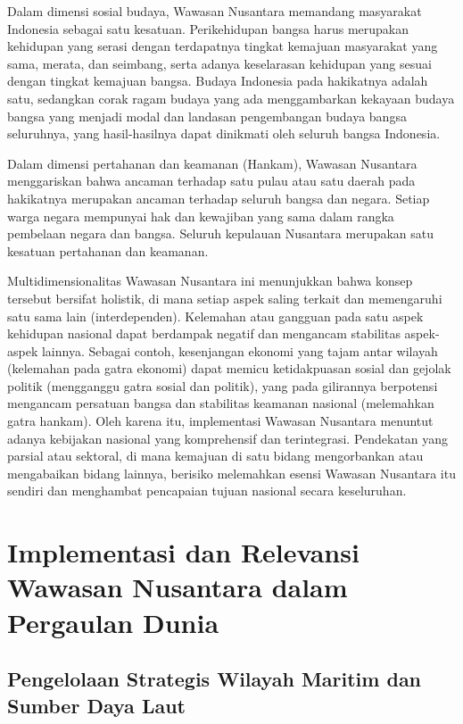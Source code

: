 \documentclass[12pt, a4paper]{article}
\begin{document}
Dalam dimensi sosial budaya, Wawasan Nusantara memandang masyarakat Indonesia sebagai satu kesatuan. Perikehidupan bangsa harus merupakan kehidupan yang serasi dengan terdapatnya tingkat kemajuan masyarakat yang sama, merata, dan seimbang, serta adanya keselarasan kehidupan yang sesuai dengan tingkat kemajuan bangsa. Budaya Indonesia pada hakikatnya adalah satu, sedangkan corak ragam budaya yang ada menggambarkan kekayaan budaya bangsa yang menjadi modal dan landasan pengembangan budaya bangsa seluruhnya, yang hasil-hasilnya dapat dinikmati oleh seluruh bangsa Indonesia.  

Dalam dimensi pertahanan dan keamanan (Hankam), Wawasan Nusantara menggariskan bahwa ancaman terhadap satu pulau atau satu daerah pada hakikatnya merupakan ancaman terhadap seluruh bangsa dan negara. Setiap warga negara mempunyai hak dan kewajiban yang sama dalam rangka pembelaan negara dan bangsa. Seluruh kepulauan Nusantara merupakan satu kesatuan pertahanan dan keamanan.  

Multidimensionalitas Wawasan Nusantara ini menunjukkan bahwa konsep tersebut bersifat holistik, di mana setiap aspek saling terkait dan memengaruhi satu sama lain (interdependen). Kelemahan atau gangguan pada satu aspek kehidupan nasional dapat berdampak negatif dan mengancam stabilitas aspek-aspek lainnya. Sebagai contoh, kesenjangan ekonomi yang tajam antar wilayah (kelemahan pada gatra ekonomi) dapat memicu ketidakpuasan sosial dan gejolak politik (mengganggu gatra sosial dan politik), yang pada gilirannya berpotensi mengancam persatuan bangsa dan stabilitas keamanan nasional (melemahkan gatra hankam). Oleh karena itu, implementasi Wawasan Nusantara menuntut adanya kebijakan nasional yang komprehensif dan terintegrasi. Pendekatan yang parsial atau sektoral, di mana kemajuan di satu bidang mengorbankan atau mengabaikan bidang lainnya, berisiko melemahkan esensi Wawasan Nusantara itu sendiri dan menghambat pencapaian tujuan nasional secara keseluruhan.  


\section{Implementasi dan Relevansi Wawasan Nusantara dalam Pergaulan Dunia}
\subsection*{Pengelolaan Strategis Wilayah Maritim dan Sumber Daya Laut}
\end{document}

